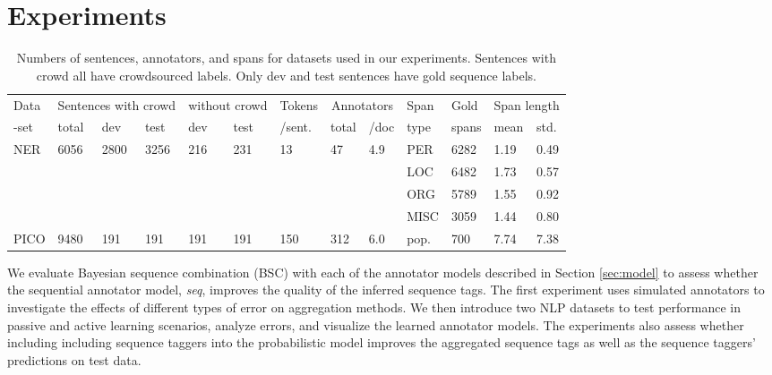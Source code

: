 \section{Experiments}\label{sec:expts_all}

\begin{table}[t]
\small
\begin{tabularx}{\textwidth}{ X X X X X X l l l X X X X} \toprule
Data & \multicolumn{3}{c}{Sentences with crowd} & \multicolumn{2}{c}{without crowd} & Tokens & \multicolumn{2}{c}{Annotators} & Span & Gold & \multicolumn{2}{c}{Span length}  \\
-set & total & dev & test & dev & test %
& /sent. & total & /doc & type & spans & mean & std.  \\
\toprule
NER & 6056 & 2800 & 3256 & 216 & 231 & 13 & 47 & 4.9 & PER & 6282 & 1.19 & 0.49 \\
&       & & & & & & &  & LOC  & 6482 & 1.73 & 0.57\\
&       & & & & & & & & ORG  & 5789 & 1.55 & 0.92\\
&       & & & & & & & & MISC & 3059 & 1.44 & 0.80\\ \midrule
PICO & 9480 & 191 & 191 & 191 & 191 & 150 & 312 & 6.0 & pop. & 700 & 7.74 & 7.38  \\ \bottomrule
\end{tabularx}
\label{tab:datasets}
\caption{Numbers of sentences, annotators, and spans for datasets used in our experiments. Sentences with crowd all have crowdsourced labels. Only dev and test sentences have gold sequence labels.}
\end{table}
We evaluate Bayesian sequence combination (BSC) with each of the 
annotator models described in Section \ref{sec:model}
to assess whether the sequential annotator model, \emph{seq},
improves the quality of the inferred sequence tags. 
The first experiment uses simulated annotators to investigate the effects of different 
types of error on aggregation methods.
We then introduce two NLP datasets to 
test performance in passive and active learning scenarios, 
analyze errors, and
visualize the learned annotator models.
The experiments also assess whether including including sequence taggers into the probabilistic model
improves the aggregated sequence tags 
as well as the sequence taggers' predictions on test data.

